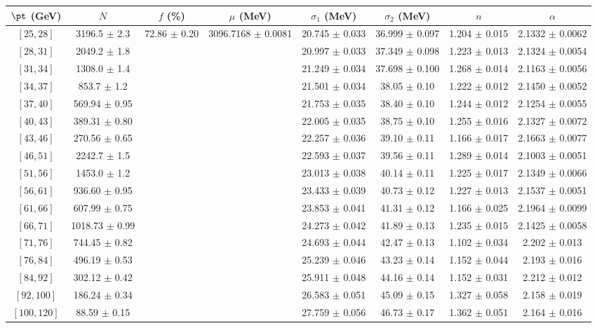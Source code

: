 \begin{tabular}{c||c|c|c|c|c|c|c}
$\pt$ (GeV) & $N$ & $f$ (\%) & $\mu$ (MeV) & $\sigma_1$ (MeV) & $\sigma_2$ (MeV) & $n$ & $\alpha$ \\
\hline
$[25, 28]$ & 3196.5 $\pm$ 2.3 & \multirow{17}{*}{72.86 $\pm$ 0.20} & \multirow{17}{*}{3096.7168 $\pm$ 0.0081} & 20.745 $\pm$ 0.033 & 36.999 $\pm$ 0.097 & 1.204 $\pm$ 0.015 & 2.1332 $\pm$ 0.0062\\
$[28, 31]$ & 2049.2 $\pm$ 1.8 &  &  & 20.997 $\pm$ 0.033 & 37.349 $\pm$ 0.098 & 1.223 $\pm$ 0.013 & 2.1324 $\pm$ 0.0054\\
$[31, 34]$ & 1308.0 $\pm$ 1.4 &  &  & 21.249 $\pm$ 0.034 & 37.698 $\pm$ 0.100 & 1.268 $\pm$ 0.014 & 2.1163 $\pm$ 0.0056\\
$[34, 37]$ & 853.7 $\pm$ 1.2 &  &  & 21.501 $\pm$ 0.034 & 38.05 $\pm$ 0.10 & 1.222 $\pm$ 0.012 & 2.1450 $\pm$ 0.0052\\
$[37, 40]$ & 569.94 $\pm$ 0.95 &  &  & 21.753 $\pm$ 0.035 & 38.40 $\pm$ 0.10 & 1.244 $\pm$ 0.012 & 2.1254 $\pm$ 0.0055\\
$[40, 43]$ & 389.31 $\pm$ 0.80 &  &  & 22.005 $\pm$ 0.035 & 38.75 $\pm$ 0.10 & 1.255 $\pm$ 0.016 & 2.1327 $\pm$ 0.0072\\
$[43, 46]$ & 270.56 $\pm$ 0.65 &  &  & 22.257 $\pm$ 0.036 & 39.10 $\pm$ 0.11 & 1.166 $\pm$ 0.017 & 2.1663 $\pm$ 0.0077\\
$[46, 51]$ & 2242.7 $\pm$ 1.5 &  &  & 22.593 $\pm$ 0.037 & 39.56 $\pm$ 0.11 & 1.289 $\pm$ 0.014 & 2.1003 $\pm$ 0.0051\\
$[51, 56]$ & 1453.0 $\pm$ 1.2 &  &  & 23.013 $\pm$ 0.038 & 40.14 $\pm$ 0.11 & 1.225 $\pm$ 0.017 & 2.1349 $\pm$ 0.0066\\
$[56, 61]$ & 936.60 $\pm$ 0.95 &  &  & 23.433 $\pm$ 0.039 & 40.73 $\pm$ 0.12 & 1.227 $\pm$ 0.013 & 2.1537 $\pm$ 0.0051\\
$[61, 66]$ & 607.99 $\pm$ 0.75 &  &  & 23.853 $\pm$ 0.041 & 41.31 $\pm$ 0.12 & 1.166 $\pm$ 0.025 & 2.1964 $\pm$ 0.0099\\
$[66, 71]$ & 1018.73 $\pm$ 0.99 &  &  & 24.273 $\pm$ 0.042 & 41.89 $\pm$ 0.13 & 1.235 $\pm$ 0.015 & 2.1425 $\pm$ 0.0058\\
$[71, 76]$ & 744.45 $\pm$ 0.82 &  &  & 24.693 $\pm$ 0.044 & 42.47 $\pm$ 0.13 & 1.102 $\pm$ 0.034 & 2.202 $\pm$ 0.013\\
$[76, 84]$ & 496.19 $\pm$ 0.53 &  &  & 25.239 $\pm$ 0.046 & 43.23 $\pm$ 0.14 & 1.152 $\pm$ 0.044 & 2.193 $\pm$ 0.016\\
$[84, 92]$ & 302.12 $\pm$ 0.42 &  &  & 25.911 $\pm$ 0.048 & 44.16 $\pm$ 0.14 & 1.152 $\pm$ 0.031 & 2.212 $\pm$ 0.012\\
$[92, 100]$ & 186.24 $\pm$ 0.34 &  &  & 26.583 $\pm$ 0.051 & 45.09 $\pm$ 0.15 & 1.327 $\pm$ 0.058 & 2.158 $\pm$ 0.019\\
$[100, 120]$ & 88.59 $\pm$ 0.15 &  &  & 27.759 $\pm$ 0.056 & 46.73 $\pm$ 0.17 & 1.362 $\pm$ 0.051 & 2.164 $\pm$ 0.016\\
\end{tabular}
